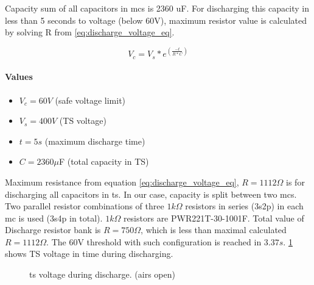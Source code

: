 Capacity sum of all capacitors in \glspl{mc} is 2360 uF. For discharging this capacity in less than 5 seconds to voltage (below 60V), maximum resistor value is calculated by solving R from \ref{eq:discharge_voltage_eq}.

\begin{equation}
	V_{c}=V_{s}*e^{(\frac{-t}{R*C})}
	\label{eq:discharge_voltage_eq}
\end{equation}

\paragraph{Values}
\begin{itemize}
	\item $V_c = 60 V$ (safe voltage limit)
	\item $V_s = 400 V$ (TS voltage)
	\item $t = 5 s$ (maximum discharge time)
	\item $C = 2360\mu$F (total capacity in TS)
\end{itemize}

Maximum resistance from equation \ref{eq:discharge_voltage_eq}, $R = 1112\Omega$ is for discharging all capacitors in \gls{ts}. In our case, capacity is split between two \glspl{mc}. Two parallel resistor combinations of three $1k\Omega$ resistors in series (3s2p) in each \gls{mc} is used (3s4p in total). $1k\Omega$ resistors are PWR221T-30-1001F. Total value of Discharge resistor bank is $R = 750\Omega$, which is less than maximal calculated $R = 1112\Omega$. The 60V threshold with such configuration is reached in $3.37s$. \ref{fig:discharge_voltage_time} shows TS voltage in time during discharging.

\begin{figure}
	\caption{\gls{ts} voltage during discharge. (\glspl{air} open)}
	\label{fig:discharge_voltage_time}
\end{figure}



